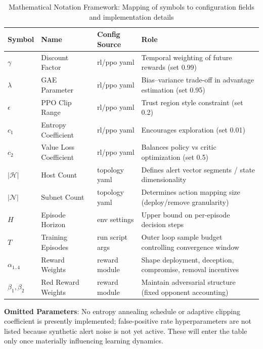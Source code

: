\documentclass[12pt,oneside]{article}
\begin{document}
\begin{table}[H]
\centering
\caption{Mathematical Notation Framework: Mapping of symbols to configuration fields and implementation details}
\label{tab:config_mapping}
\begin{tabular}{lllp{5.5cm}}
\rowcolor{cwBorder!30} \textbf{Symbol} & \textbf{Name} & \textbf{Config Source} & \textbf{Role} \\
\midrule
$\gamma$ & Discount Factor & rl/ppo yaml & Temporal weighting of future rewards (set 0.99) \\
$\lambda$ & GAE Parameter & rl/ppo yaml & Bias--variance trade-off in advantage estimation (set 0.95) \\
$\epsilon$ & PPO Clip Range & rl/ppo yaml & Trust region style constraint (set 0.2) \\
$c_1$ & Entropy Coefficient & rl/ppo yaml & Encourages exploration (set 0.01) \\
$c_2$ & Value Loss Coefficient & rl/ppo yaml & Balances policy vs critic optimization (set 0.5) \\
$|\mathcal{H}|$ & Host Count & topology yaml & Defines alert vector segments / state dimensionality \\
$|\mathcal{N}|$ & Subnet Count & topology yaml & Determines action mapping size (deploy/remove granularity) \\
$H$ & Episode Horizon & env settings & Upper bound on per-episode decision steps \\
$T$ & Training Episodes & run script args & Outer loop sample budget controlling convergence window \\
$\alpha_{1..4}$ & Reward Weights & reward module & Shape deployment, deception, compromise, removal incentives \\
$\beta_{1},\beta_{2}$ & Red Reward Weights & reward module & Maintain adversarial structure (fixed opponent accounting) \\
\bottomrule
\end{tabular}
\end{table}

	\textbf{Omitted Parameters}: No entropy annealing schedule or adaptive clipping coefficient is presently implemented; false-positive rate hyperparameters are not listed because synthetic alert noise is not yet active. These will enter the table only once materially influencing learning dynamics.


\clearpage
\end{document}

